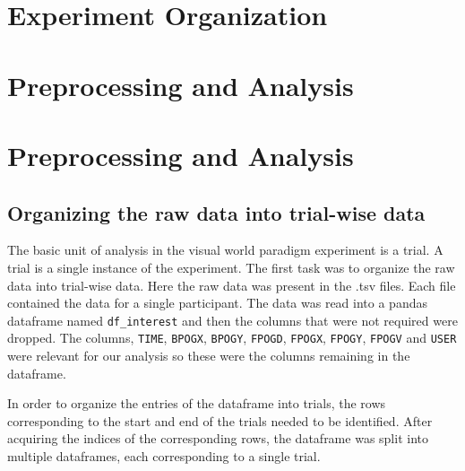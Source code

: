 \documentclass[
  a4paper,
]{article}
\begin{document}
\hypertarget{experiment-organization}{%
\section{Experiment Organization}\label{experiment-organization}}

\hypertarget{preprocessing-and-analysis}{%
\section{Preprocessing and Analysis}\label{preprocessing-and-analysis}}

\hypertarget{preprocessing-and-analysis-1}{%
\section{Preprocessing and
Analysis}\label{preprocessing-and-analysis-1}}

\hypertarget{organizing-the-raw-data-into-trial-wise-data}{%
\subsection{Organizing the raw data into trial-wise
data}\label{organizing-the-raw-data-into-trial-wise-data}}

The basic unit of analysis in the visual world paradigm experiment is a
trial. A trial is a single instance of the experiment. The first task
was to organize the raw data into trial-wise data. Here the raw data was
present in the .tsv files. Each file contained the data for a single
participant. The data was read into a pandas dataframe named
\texttt{df\_interest} and then the columns that were not required were
dropped. The columns, \texttt{TIME}, \texttt{BPOGX}, \texttt{BPOGY},
\texttt{FPOGD}, \texttt{FPOGX}, \texttt{FPOGY}, \texttt{FPOGV} and
\texttt{USER} were relevant for our analysis so these were the columns
remaining in the dataframe.

In order to organize the entries of the dataframe into trials, the rows
corresponding to the start and end of the trials needed to be
identified. After acquiring the indices of the corresponding rows, the
dataframe was split into multiple dataframes, each corresponding to a
single trial.
\end{document}
